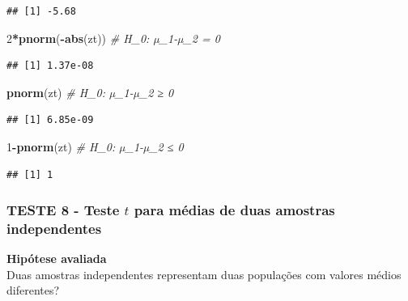 \documentclass[
]{book}
\newenvironment{Shaded}{\begin{snugshade}}{\end{snugshade}}
\newcommand{\CommentTok}[1]{\textcolor[rgb]{0.56,0.35,0.01}{\textit{#1}}}
\newcommand{\DecValTok}[1]{\textcolor[rgb]{0.00,0.00,0.81}{#1}}
\newcommand{\KeywordTok}[1]{\textcolor[rgb]{0.13,0.29,0.53}{\textbf{#1}}}
\newcommand{\NormalTok}[1]{#1}
\newcommand{\OperatorTok}[1]{\textcolor[rgb]{0.81,0.36,0.00}{\textbf{#1}}}
\theoremstyle{definition}
\theoremstyle{definition}
\theoremstyle{definition}
\theoremstyle{remark}
\begin{document}
\begin{verbatim}
## [1] -5.68
\end{verbatim}

\begin{Shaded}
\begin{Highlighting}[]
\DecValTok{2}\OperatorTok{*}\KeywordTok{pnorm}\NormalTok{(}\OperatorTok{{-}}\KeywordTok{abs}\NormalTok{(zt)) }\CommentTok{\# H\_0: µ\_1{-}µ\_2 = 0}
\end{Highlighting}
\end{Shaded}

\begin{verbatim}
## [1] 1.37e-08
\end{verbatim}

\begin{Shaded}
\begin{Highlighting}[]
\KeywordTok{pnorm}\NormalTok{(zt)         }\CommentTok{\# H\_0: µ\_1{-}µ\_2 ≥ 0}
\end{Highlighting}
\end{Shaded}

\begin{verbatim}
## [1] 6.85e-09
\end{verbatim}

\begin{Shaded}
\begin{Highlighting}[]
\DecValTok{1}\OperatorTok{{-}}\KeywordTok{pnorm}\NormalTok{(zt)       }\CommentTok{\# H\_0: µ\_1{-}µ\_2 ≤ 0}
\end{Highlighting}
\end{Shaded}

\begin{verbatim}
## [1] 1
\end{verbatim}

\hypertarget{teste-8---teste-t-para-muxe9dias-de-duas-amostras-independentes}{%
\subsubsection*{\texorpdfstring{TESTE 8 - Teste \(t\) para médias de duas amostras independentes}{TESTE 8 - Teste t para médias de duas amostras independentes}}\label{teste-8---teste-t-para-muxe9dias-de-duas-amostras-independentes}}

\textbf{Hipótese avaliada}\\
Duas amostras independentes representam duas populações com valores médios diferentes?
\end{document}
